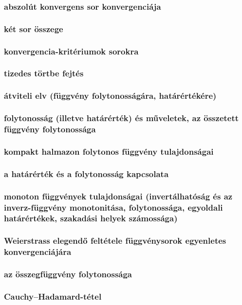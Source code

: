 \documentclass[12pt]{article}
\begin{document}
\subsubsection{abszolút konvergens sor konvergenciája}
\subsubsection{két sor összege}
\subsubsection{konvergencia-kritériumok sorokra}
\subsubsection{tizedes törtbe fejtés}
\subsubsection{átviteli elv (függvény folytonosságára, határértékére)}
\subsubsection{folytonosság (illetve határérték) és műveletek, az összetett függvény folytonossága}
\subsubsection{kompakt halmazon folytonos függvény tulajdonságai}
\subsubsection{a határérték és a folytonosság kapcsolata}
\subsubsection{monoton függvények tulajdonságai (invertálhatóság és az inverz-függvény monotonitása, folytonossága, egyoldali határértékek, szakadási helyek számossága)}
\subsubsection{Weierstrass elegendő feltétele függvénysorok egyenletes konvergenciájára}
\subsubsection{az összegfüggvény folytonossága}
\subsubsection{Cauchy–Hadamard-tétel}
\end{document}
